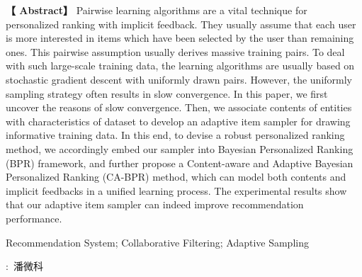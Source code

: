 \newpage

\centerline{\fangsong\bf{}}


\vskip 20bp

\hspace{4bp} {\textbf{【 Abstract】}} 
Pairwise learning algorithms are a vital technique
for personalized ranking with implicit feedback. They usually
assume that each user is more interested in items which have
been selected by the user than remaining ones. This pairwise
assumption usually derives massive training pairs. To deal with
such large-scale training data, the learning algorithms are usually
based on stochastic gradient descent with uniformly drawn pairs.
However, the uniformly sampling strategy often results in slow
convergence. In this paper, we first uncover the reasons of
slow convergence. Then, we associate contents of entities with
characteristics of dataset to develop an adaptive item sampler
for drawing informative training data. In this end, to devise a
robust personalized ranking method, we accordingly embed our
sampler into Bayesian Personalized Ranking (BPR) framework,
and further propose a Content-aware and Adaptive Bayesian
Personalized Ranking (CA-BPR) method, which can model both
contents and implicit feedbacks in a unified learning process. The
experimental results show that our adaptive item sampler can indeed improve recommendation performance.

\vskip 10bp

Recommendation System; Collaborative Filtering; Adaptive Sampling


\vskip 20bp

\begin{flushright}
	:\ 潘微科 \hspace{3cm}{ }
\end{flushright}

\label{lastpage}%